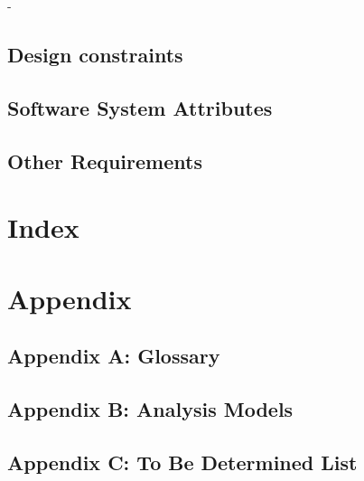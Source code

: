 -\documentclass[compsoc,draftclsnofoot,onecolumn,10pt]{IEEEtran}
\begin{document}
\subsection{Design constraints}

\subsection{Software System Attributes}

\subsection{Other Requirements}

\section{Index}

\section{Appendix}

\subsection{Appendix A: Glossary}

\subsection{Appendix B: Analysis Models}

\subsection{Appendix C: To Be Determined List}
\end{document}
